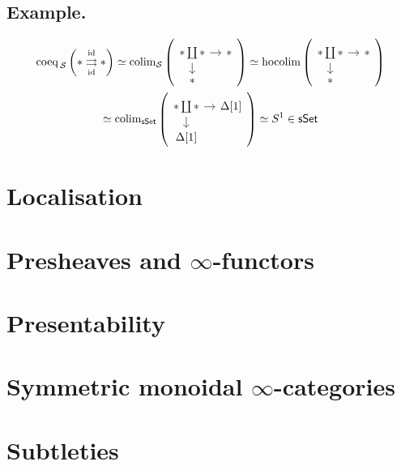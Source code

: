 \documentclass{article}
\numberwithin{equation}{subsection}
\renewcommand{\ss}[1]{\subsection{#1}}
\newcommand{\sset}{\mathsf{sSet}}
\newcommand{\id}{\mathrm{id}}
\renewcommand{\S}{\mathcal{S}}
\begin{document}
        \ss{Example.}
            \begin{gather*}
                \operatorname{coeq}_{\,\S}\left(
                    *\underset{\id}{\overset{\id}{\rightrightarrows}}*
                \right) \simeq
                \operatorname{colim}_\S\left(
                    \begin{tikzcd}[row sep=1em,column sep=1em,ampersand replacement=\&]
                        *\coprod* \dar\rar \& *\\
                        *
                    \end{tikzcd}
                \right) \simeq
                \operatorname{hocolim}\left(
                    \begin{tikzcd}[row sep=1em,column sep=1em,ampersand replacement=\&]
                        *\coprod* \dar\rar \& *\\
                        *
                    \end{tikzcd}
                \right) \\\simeq
                \operatorname{colim}_\sset\left(
                    \begin{tikzcd}[row sep=1em,column sep=1em,ampersand replacement=\&]
                        *\coprod* \dar\rar \& \Delta[1]\\
                        \Delta[1]
                    \end{tikzcd}
                \right) \simeq
                S^1\in\sset
            \end{gather*}

    \section{Localisation}

    \section{Presheaves and $\infty$-functors}

    \section{Presentability}

    \section{Symmetric monoidal $\infty$-categories}

    \section{Subtleties}
\end{document}
